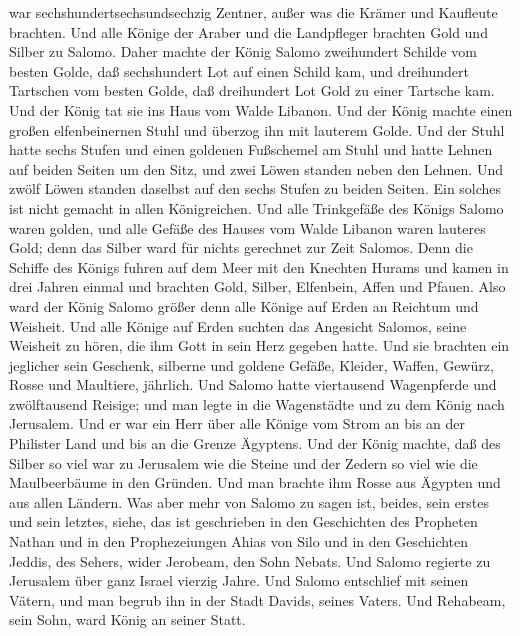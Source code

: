 war sechshundertsechsundsechzig Zentner,  außer was die
Krämer und Kaufleute brachten. Und alle Könige der Araber und die
Landpfleger brachten Gold und Silber zu Salomo.  Daher
machte der König Salomo zweihundert Schilde vom besten Golde, daß
sechshundert Lot auf einen Schild kam,  und dreihundert
Tartschen vom besten Golde, daß dreihundert Lot Gold zu einer Tartsche
kam.  Und der König tat sie ins Haus vom Walde Libanon. Und
der König machte einen großen elfenbeinernen Stuhl und überzog ihn mit
lauterem Golde.  Und der Stuhl hatte sechs Stufen und einen
goldenen Fußschemel am Stuhl und hatte Lehnen auf beiden Seiten um den
Sitz, und zwei Löwen standen neben den Lehnen.  Und zwölf
Löwen standen daselbst auf den sechs Stufen zu beiden Seiten. Ein
solches ist nicht gemacht in allen Königreichen.  Und alle
Trinkgefäße des Königs Salomo waren golden, und alle Gefäße des Hauses
vom Walde Libanon waren lauteres Gold; denn das Silber ward für nichts
gerechnet zur Zeit Salomos.  Denn die Schiffe des Königs
fuhren auf dem Meer mit den Knechten Hurams und kamen in drei Jahren
einmal und brachten Gold, Silber, Elfenbein, Affen und Pfauen.
 Also ward der König Salomo größer denn alle Könige auf
Erden an Reichtum und Weisheit.  Und alle Könige auf Erden
suchten das Angesicht Salomos, seine Weisheit zu hören, die ihm Gott in
sein Herz gegeben hatte.  Und sie brachten ein jeglicher
sein Geschenk, silberne und goldene Gefäße, Kleider, Waffen, Gewürz,
Rosse und Maultiere, jährlich.  Und Salomo hatte
viertausend Wagenpferde und zwölftausend Reisige; und man legte in die
Wagenstädte und zu dem König nach Jerusalem.  Und er war
ein Herr über alle Könige vom Strom an bis an der Philister Land und bis
an die Grenze Ägyptens.  Und der König machte, daß des
Silber so viel war zu Jerusalem wie die Steine und der Zedern so viel
wie die Maulbeerbäume in den Gründen.  Und man brachte ihm
Rosse aus Ägypten und aus allen Ländern.  Was aber mehr von
Salomo zu sagen ist, beides, sein erstes und sein letztes, siehe, das
ist geschrieben in den Geschichten des Propheten Nathan und in den
Prophezeiungen Ahias von Silo und in den Geschichten Jeddis, des Sehers,
wider Jerobeam, den Sohn Nebats.  Und Salomo regierte zu
Jerusalem über ganz Israel vierzig Jahre.  Und Salomo
entschlief mit seinen Vätern, und man begrub ihn in der Stadt Davids,
seines Vaters. Und Rehabeam, sein Sohn, ward König an seiner Statt.

